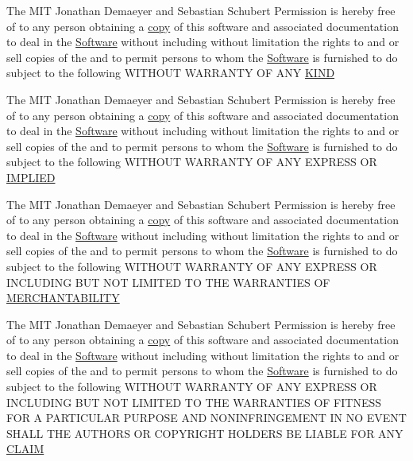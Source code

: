 \begin{DoxyCompactItemize}
\item 
The M\+IT Jonathan Demaeyer and Sebastian Schubert Permission is hereby free of to any person obtaining a \hyperlink{LICENSE_8txt_a51c339ce34cc545067d7d7c01c627159}{copy} of this software and associated documentation to deal in the \hyperlink{LICENSE_8txt_a5972617605af8d0ee35a18608e832e08}{Software} without including without limitation the rights to and or sell copies of the and to permit persons to whom the \hyperlink{LICENSE_8txt_a5972617605af8d0ee35a18608e832e08}{Software} is furnished to do subject to the following W\+I\+T\+H\+O\+UT W\+A\+R\+R\+A\+N\+TY OF A\+NY \hyperlink{LICENSE_8txt_aad2be92199d1e111cb85f40e59591e92}{K\+I\+ND}
\item 
The M\+IT Jonathan Demaeyer and Sebastian Schubert Permission is hereby free of to any person obtaining a \hyperlink{LICENSE_8txt_a51c339ce34cc545067d7d7c01c627159}{copy} of this software and associated documentation to deal in the \hyperlink{LICENSE_8txt_a5972617605af8d0ee35a18608e832e08}{Software} without including without limitation the rights to and or sell copies of the and to permit persons to whom the \hyperlink{LICENSE_8txt_a5972617605af8d0ee35a18608e832e08}{Software} is furnished to do subject to the following W\+I\+T\+H\+O\+UT W\+A\+R\+R\+A\+N\+TY OF A\+NY E\+X\+P\+R\+E\+SS OR \hyperlink{LICENSE_8txt_a0f296e8325b962869e8026bdd8d12336}{I\+M\+P\+L\+I\+ED}
\item 
The M\+IT Jonathan Demaeyer and Sebastian Schubert Permission is hereby free of to any person obtaining a \hyperlink{LICENSE_8txt_a51c339ce34cc545067d7d7c01c627159}{copy} of this software and associated documentation to deal in the \hyperlink{LICENSE_8txt_a5972617605af8d0ee35a18608e832e08}{Software} without including without limitation the rights to and or sell copies of the and to permit persons to whom the \hyperlink{LICENSE_8txt_a5972617605af8d0ee35a18608e832e08}{Software} is furnished to do subject to the following W\+I\+T\+H\+O\+UT W\+A\+R\+R\+A\+N\+TY OF A\+NY E\+X\+P\+R\+E\+SS OR I\+N\+C\+L\+U\+D\+I\+NG B\+UT N\+OT L\+I\+M\+I\+T\+ED TO T\+HE W\+A\+R\+R\+A\+N\+T\+I\+ES OF \hyperlink{LICENSE_8txt_ad268e4ad5bd7d8de506e602441be0b04}{M\+E\+R\+C\+H\+A\+N\+T\+A\+B\+I\+L\+I\+TY}
\item 
The M\+IT Jonathan Demaeyer and Sebastian Schubert Permission is hereby free of to any person obtaining a \hyperlink{LICENSE_8txt_a51c339ce34cc545067d7d7c01c627159}{copy} of this software and associated documentation to deal in the \hyperlink{LICENSE_8txt_a5972617605af8d0ee35a18608e832e08}{Software} without including without limitation the rights to and or sell copies of the and to permit persons to whom the \hyperlink{LICENSE_8txt_a5972617605af8d0ee35a18608e832e08}{Software} is furnished to do subject to the following W\+I\+T\+H\+O\+UT W\+A\+R\+R\+A\+N\+TY OF A\+NY E\+X\+P\+R\+E\+SS OR I\+N\+C\+L\+U\+D\+I\+NG B\+UT N\+OT L\+I\+M\+I\+T\+ED TO T\+HE W\+A\+R\+R\+A\+N\+T\+I\+ES OF F\+I\+T\+N\+E\+SS F\+OR A P\+A\+R\+T\+I\+C\+U\+L\+AR P\+U\+R\+P\+O\+SE A\+ND N\+O\+N\+I\+N\+F\+R\+I\+N\+G\+E\+M\+E\+NT IN NO E\+V\+E\+NT S\+H\+A\+LL T\+HE A\+U\+T\+H\+O\+RS OR C\+O\+P\+Y\+R\+I\+G\+HT H\+O\+L\+D\+E\+RS BE L\+I\+A\+B\+LE F\+OR A\+NY \hyperlink{LICENSE_8txt_ac3813fbcca87515f1262b78e8f2969a9}{C\+L\+A\+IM}

\end{DoxyCompactItemize}
